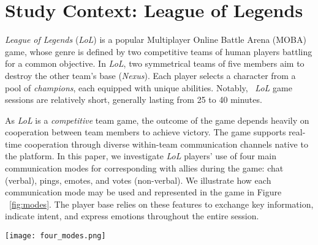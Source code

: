 \section{Study Context: League of Legends}
\textit{League of Legends} (\textit{LoL}) is a popular Multiplayer Online Battle Arena (MOBA) game, whose genre is defined by two competitive teams of human players battling for a common objective. In \textit{LoL}, two symmetrical teams of five members aim to destroy the other team's base (\textit{Nexus}). Each player selects a character from a pool of \textit{champions}, each equipped with unique abilities. Notably, ~\textit{LoL} game sessions are relatively short, generally lasting from 25 to 40 minutes. 

As \textit{LoL} is a \textit{competitive} team game, the outcome of the game depends heavily on cooperation between team members to achieve victory. The game supports real-time cooperation through diverse within-team communication channels native to the platform. In this paper, we investigate \textit{LoL} players' use of four main communication modes for corresponding with allies during the game: chat (verbal), pings, emotes, and votes (non-verbal). We illustrate how each communication mode may be used and represented in the game in Figure ~\ref{fig:modes}. The player base relies on these features to exchange key information, indicate intent, and express emotions throughout the entire session.

\begin{figure*}
    \centering
    \texttt{[image: four\_modes.png]}
    \caption{An example of four main communication modes of \textit{LoL}. (A) Chat is the medium through which players can type in-game messages to other players or read previous logs of in-game changes or signals, (B) Pings are quick alerts used for signaling information to other teammates, (C) Emotes are used to express emotions to other players, and (D) Votes are used to determine calls for objectives or to surrender the game.}
    \label{fig:modes}
\end{figure*}

